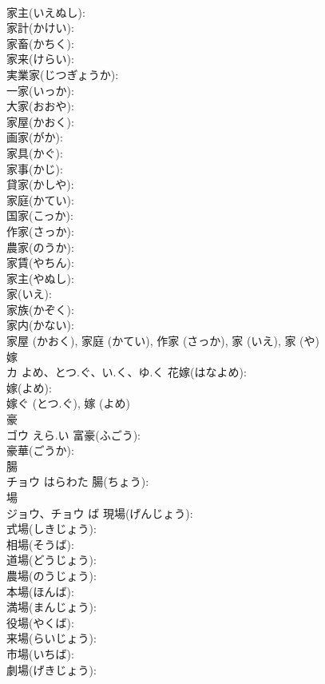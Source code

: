\documentclass[8pt]{extreport}
\begin{document}
\begin{CJK}{UTF8}{min}
\\	家主(いえぬし): 
\\	家計(かけい): 
\\	家畜(かちく): 
\\	家来(けらい): 
\\	実業家(じつぎょうか): 
\\	一家(いっか): 
\\	大家(おおや): 
\\	家屋(かおく): 
\\	画家(がか): 
\\	家具(かぐ): 
\\	家事(かじ): 
\\	貸家(かしや): 
\\	家庭(かてい): 
\\	国家(こっか): 
\\	作家(さっか): 
\\	農家(のうか): 
\\	家賃(やちん): 
\\	家主(やぬし): 
\\	家(いえ): 
\\	家族(かぞく): 
\\	家内(かない): 
\\	家屋 (かおく), 家庭 (かてい), 作家 (さっか), 家 (いえ), 家 (や)
\\	嫁			
\\	カ	よめ、とつ.ぐ、い.く、ゆ.く	花嫁(はなよめ): 
\\	嫁(よめ): 
\\	嫁ぐ (とつ.ぐ), 嫁 (よめ)
\\	豪		
\\	ゴウ	えら.い	富豪(ふごう): 
\\	豪華(ごうか): 
\\	腸		
\\	チョウ	はらわた	腸(ちょう): 
\\	場		
\\	ジョウ、チョウ	ば	現場(げんじょう): 
\\	式場(しきじょう): 
\\	相場(そうば): 
\\	道場(どうじょう): 
\\	農場(のうじょう): 
\\	本場(ほんば): 
\\	満場(まんじょう): 
\\	役場(やくば): 
\\	来場(らいじょう): 
\\	市場(いちば): 
\\	劇場(げきじょう): 

\end{CJK}
\end{document}
